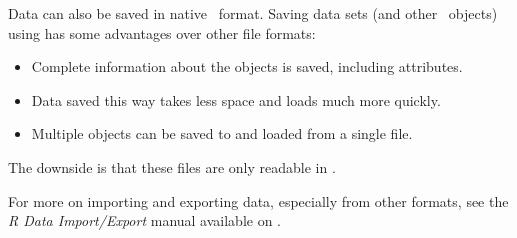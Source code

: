 Data can also be saved in native \R\ format.  Saving data sets 
(and other \R\ objects) using  has some advantages over other file formats:
\begin{itemize}
  \item 
  Complete information about the objects is saved, including attributes.
  \item
  Data saved this way takes less space and loads much more quickly.
  \item
  Multiple objects can be saved to and loaded from a single file.
\end{itemize}
The downside is that these files are only readable in \R.

\begin{knitrout}
\end{knitrout}


For more on importing and exporting data, especially from other
formats, see the 
\textit{R Data Import/Export} manual available on \cran.


